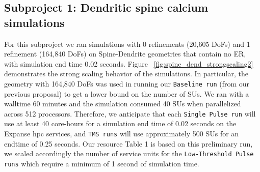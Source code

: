 \subsection*{Subproject 1: Dendritic spine calcium simulations}
{For this subproject we ran simulations with 0 refinements (20,605 DoFs) and 1 refinement (164,840 DoFs) on Spine-Dendrite geometries that contain no ER, with simulation end time 0.02 seconds. Figure ~\ref{fig:spine_dend_strongscaling2} demonstrates the strong scaling behavior of the simulations. In particular, the geometry with 164,840 DoFs was used in running our \texttt{Baseline run} (from our previous proposal) to get a lower bound on the number of SUs. We ran with a walltime 60 minutes and the simulation consumed 40 SUs when parallelized across 512 processors. Therefore, we anticipate that each \texttt{Single Pulse run} will use at least 40 core-hours for a simulation end time of 0.02 seconds on the Expanse hpc services, and \texttt{TMS runs} will use approximately 500 SUs for an endtime of 0.25 seconds.} Our resource Table 1 is based on this preliminary run, we scaled accordingly the number of service units for the \texttt{Low-Threshold Pulse runs} which require a minimum of 1 second of simulation time.
